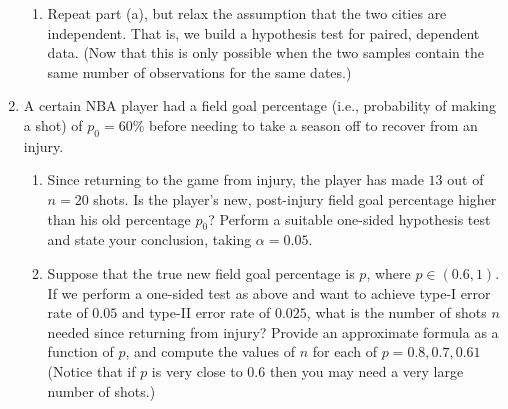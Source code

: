 \documentclass{article}    %
\begin{document}
\begin{enumerate}[leftmargin=0.55cm]
\begin{enumerate}
			\item Repeat part (a), but relax the assumption that the two cities are independent. That is, we build a hypothesis test for paired, dependent data. (Now that this is only possible when the two samples contain the same number of observations for the same dates.)\\
			
		\end{enumerate}
		
		\item A certain NBA player had a field goal percentage (i.e., probability of making a shot) of $p_0 = 60\%$ before needing to take a season off to recover from an injury. 
		
		\begin{enumerate}
			\item Since returning to the game from injury, the
			player has made $ 13 $ out of $ n=20 $ shots. Is the player's new, post-injury field goal percentage higher than his old percentage $ p_0 $? Perform a suitable one-sided hypothesis test and state your conclusion, taking $\alpha = 0.05$. 
			
			\item Suppose that the true new field goal percentage is $ p $, where $ p\in(0.6,1) $. If we perform a one-sided test as above and want to achieve type-I error rate of $ 0.05$ and type-II error rate of $ 0.025 $, what is the number of shots $ n $ needed since returning from injury? Provide an approximate formula as a function of $ p $, and compute the values of $n$ for each of $p = 0.8, 0.7, 0.61$ (Notice
			that if $ p $ is very close to $ 0.6 $ then you may need a very large number of shots.) 
			
		\end{enumerate}
		
	\end{enumerate}
\end{document}
